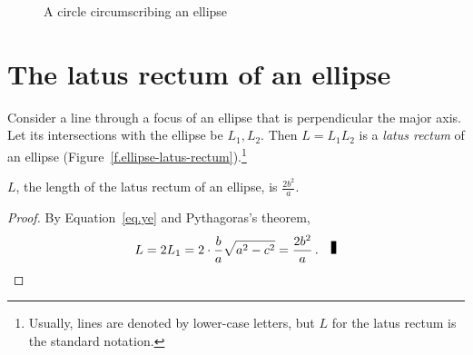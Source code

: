 \begin{figure}[tb]
\begin{center}
\caption{A circle circumscribing an ellipse}\label{f.ellipse-circle}
\end{center}
\end{figure}


\section{The latus rectum of an ellipse}

\begin{definition}\label{def.ellipse-lr}
Consider a line through a focus of an ellipse that is perpendicular the major axis. Let its intersections with the ellipse be $L_1,L_2$. Then $L=L_1L_2$ is a \emph{latus rectum} of an ellipse (Figure~\ref{f.ellipse-latus-rectum}).\footnote{Usually, lines are denoted by lower-case letters, but $L$ for the latus rectum is the standard notation.}
\end{definition}
\begin{theorem}\label{thm.ellipse-lr}
$L$, the length of the latus rectum of an ellipse, is 
$\displaystyle\frac{2b^2}{a}$.
\end{theorem}
\begin{proof}
By Equation~\ref{eq.ye} and Pythagoras's theorem,
\[
L=2L_1=2\cdot\frac{b}{a}\sqrt{a^2-c^2}=\displaystyle\frac{2b^2}{a}\,.\fqed
\]
\end{proof}

